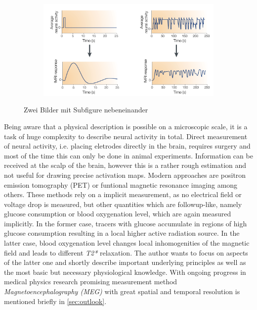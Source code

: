 \documentclass[a4paper]{scrartcl}
\begin{document}
\begin{figure}[ht]
\begin{subfigure}[l]{0.35\textwidth}
\end{subfigure}
\begin{subfigure}[r]{0.6\textwidth}
\includegraphics[width = \textwidth]{pictures/signalProcessing.png}
\end{subfigure}
\caption{Zwei Bilder mit Subfigure nebeneinander}
\end{figure}

Being aware that a physical description is possible on a microscopic scale, it is a task of huge complexity to describe neural activity in total.
Direct measurement of neural activity, i.e. placing eletrodes directly in the brain, requires surgery and most of the time this can only be done in animal experiments. 
Information can be received at the scalp of the brain, however this is a rather rough estimation and not useful for drawing precise activation maps.\cite[6]{buxton}
Modern approaches are positron emission tomography (PET) or funtional magnetic resonance imaging among others.
These methods rely on a implicit measurement, as no electrical field or voltage drop is measured, but other quantities which are followup-like, namely glucose consumption or blood oxygenation level, which are again measured implicitly.
In the former case, tracers with glucose accumulate in regions of high glucose consumption resulting in a local higher active radiation source.
In the latter case, blood oxygenation level changes local inhomogenities of the magnetic field and leads to different \textit{T2*} relaxation.
The author wants to focus on aspects of the latter one and shortly describe important underlying principles as well as the most basic but necessary physiological knowledge.
With ongoing progress in medical physics research promising measurement method \textit{Magnetoencephalography (MEG)} with great spatial and temporal resolution is mentioned briefly in \ref{sec:outlook}. 
\end{document}
